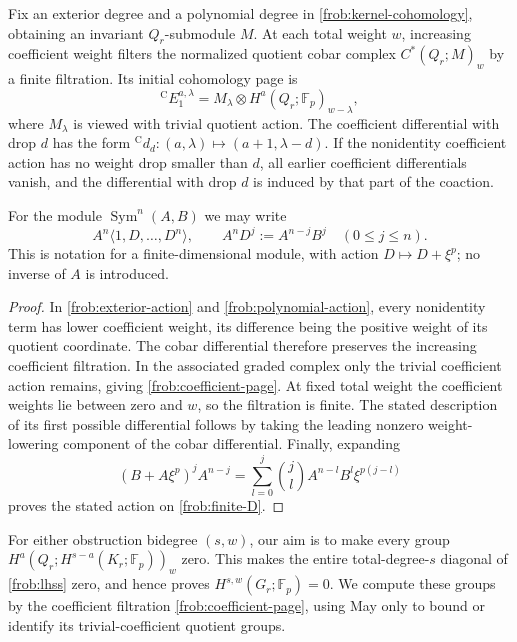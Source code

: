 \begin{lemma}\label{frob:coefficients}
Fix an exterior degree and a polynomial degree in
\eqref{frob:kernel-cohomology}, obtaining an invariant $Q_r$-submodule $M$.
At each total weight $w$, increasing coefficient weight filters the
normalized quotient cobar complex $C^*(Q_r;M)_w$ by a finite
filtration.  Its initial cohomology page is
\begin{equation}\label{frob:coefficient-page}
 {}^{\mathrm C}E_1^{a,\lambda}
      =M_{\lambda}\otimes H^a(Q_r;\mathbb F_p)_{w-\lambda},
\end{equation}
where $M_\lambda$ is viewed with trivial quotient action.
The coefficient differential with drop $d$ has the form
$ {}^{\mathrm C}d_d:(a,\lambda)\mapsto(a+1,\lambda-d)$.
If the nonidentity coefficient action has no weight drop smaller than
$d$, all earlier coefficient differentials vanish, and the differential
with drop $d$ is induced by that part of the coaction.

For the module $\operatorname{Sym}^n(A,B)$ we may write
\begin{equation}\label{frob:finite-D}
 A^n\langle1,D,\ldots,D^n\rangle,
 \qquad A^nD^j:=A^{n-j}B^j\quad(0\leq j\leq n).
\end{equation}
This is notation for a finite-dimensional module, with action
$D\mapsto D+\xi^p$; no inverse of $A$ is introduced.
\end{lemma}

\begin{proof}
In \eqref{frob:exterior-action} and
\eqref{frob:polynomial-action}, every nonidentity term has lower
coefficient weight, its difference being the positive weight of its
quotient coordinate.  The cobar differential therefore preserves
the increasing coefficient filtration.  In the associated graded
complex only the trivial coefficient action remains, giving
\eqref{frob:coefficient-page}.  At fixed total weight the coefficient
weights lie between zero and $w$, so the filtration is finite.
The stated description of its first possible differential follows by
taking the leading nonzero weight-lowering component of the cobar
differential.  Finally, expanding
\[
 (B+A\xi^p)^jA^{n-j}
   =\sum_{l=0}^j\binom jl A^{n-l}B^l\xi^{p(j-l)}
\]
proves the stated action on \eqref{frob:finite-D}.
\end{proof}

For either obstruction bidegree $(s,w)$, our aim is to make every group
$H^a(Q_r;H^{s-a}(K_r;\mathbb F_p))_w$ zero.  This makes the entire
total-degree-$s$ diagonal of \eqref{frob:lhss} zero, and hence proves
$H^{s,w}(G_r;\mathbb F_p)=0$.  We compute these groups by the coefficient
filtration \eqref{frob:coefficient-page}, using May only to bound or identify
its trivial-coefficient quotient groups.

